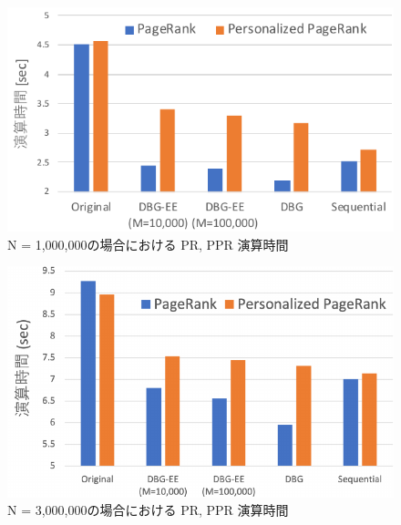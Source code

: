 \begin{figure}[t]
  \centering
  \includegraphics[width=0.8\linewidth]{./figure/algo_time_1000000.pdf}
  \caption{N = 1,000,000の場合における PR, PPR 演算時間}
  \label{algo_time_1000000}
\end{figure}
\begin{figure}[t]
  \centering
  \includegraphics[width=0.8\linewidth]{./figure/algo_time_3000000.pdf}
  \caption{N = 3,000,000の場合における PR, PPR 演算時間}
  \label{algo_time_3000000}
\end{figure}